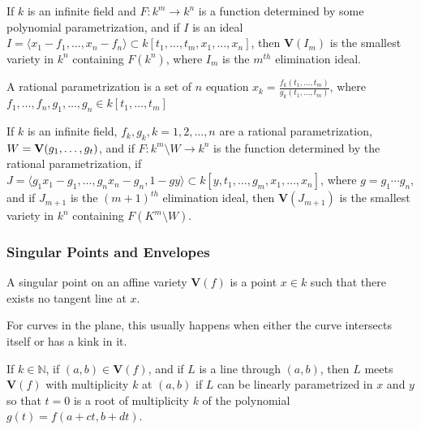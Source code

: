 \documentclass[../main.tex]{subfiles}
\begin{document}
\begin{theorem}
If $k$ is an infinite field and $F:k^m\rightarrow k^n$ is a function determined by some polynomial parametrization, and if $I$ is an ideal $I = \langle x_1-f_1,\hdots, x_n - f_n\rangle \subset k[t_1,\hdots, t_m, x_1,\hdots, x_n]$, then $\textbf{V}(I_m)$ is the smallest variety in $k^n$ containing $F(k^n)$, where $I_m$ is the $m^{th}$ elimination ideal.
\end{theorem}

\begin{definition}
A rational parametrization is a set of $n$ equation $x_k = \frac{f_k(t_1,\hdots, t_m)}{g_k(t_1,\hdots, t_m)}$, where $f_1,\hdots, f_n, g_1,\hdots, g_n\in k[t_1,\hdots, t_m]$
\end{definition}

\begin{theorem}
If $k$ is an infinite field, $f_k, g_k, k=1,2,\hdots, n$ are a rational parametrization, $W = \textbf{V}(g_1,\hdots, g_t)$, and if $F:k^m\setminus W \rightarrow k^n$ is the function determined by the rational parametrization, if $J = \langle g_1 x_1 - g_1,\hdots, g_n x_n - g_n, 1-gy\rangle \subset k[y,t_1,\hdots, g_m, x_1,\hdots, x_n]$, where $g = g_1\cdots g_n$, and if $J_{m+1}$ is the $(m+1)^{th}$ elimination ideal, then $\textbf{V}(J_{m+1})$ is the smallest variety in $k^n$ containing $F(K^m\setminus W)$.
\end{theorem}
%
\subsubsection{Singular Points and Envelopes}
%
\begin{definition}
A singular point on an affine variety $\textbf{V}(f)$ is a point $x\in k$ such that there exists no tangent line at $x$.
\end{definition}

\begin{remark}
For curves in the plane, this usually happens when either the curve intersects itself or has a kink in it.
\end{remark}

\begin{definition}
If $k\in \mathbb{N}$, if $(a,b)\in \textbf{V}(f)$, and if $L$ is a line through $(a,b)$, then $L$ meets $\textbf{V}(f)$ with multiplicity $k$ at $(a,b)$ if $L$ can be linearly parametrized in $x$ and $y$ so that $t=0$ is a root of multiplicity $k$ of the polynomial $g(t) = f(a+ct,b+dt)$.
\end{definition}
\end{document}
